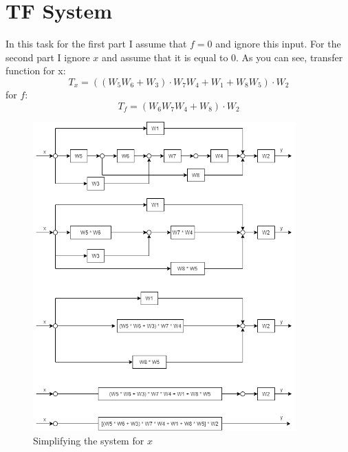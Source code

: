 \documentclass{article}
\begin{document}
\section{TF System}
In this task for the first part I assume that $f = 0$ and ignore this input.
For the second part I ignore $x$ and assume that it is equal to 0.
As you can see, transfer function for x:
\begin{equation}
	T_x = ((W_5 W_6 + W_3) \cdot W_7 W_4 + W_1 + W_8 W_5) \cdot W_2
\end{equation}
for $f$:
\begin{equation}
	T_f = (W_6 W_7 W_4 + W_8) \cdot W_2
\end{equation}

\begin{figure}[H]
        \centering
        \includegraphics[width=0.9\textwidth]{sources/image6_1.png}
        \caption{Simplifying the system for $x$}
        \label{fig:tf1}
\end{figure}
\end{document}
